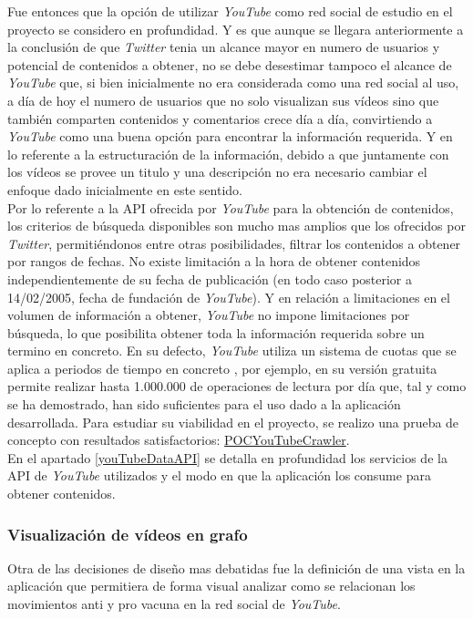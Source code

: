 \documentclass[11pt,a4paper]{article}
\begin{document}
Fue entonces que la opción de utilizar \textit{YouTube} como red social de estudio en el proyecto se considero en profundidad. Y es que aunque se llegara anteriormente a la conclusión de que \textit{Twitter} tenia un alcance mayor en numero de usuarios y potencial de contenidos a obtener, no se debe desestimar tampoco el alcance de \textit{YouTube} que, si bien inicialmente no era considerada como una red social al uso, a día de hoy el numero de usuarios que no solo visualizan sus vídeos sino que también comparten contenidos y comentarios crece día a día, convirtiendo a \textit{YouTube} como una buena opción para encontrar la información requerida. Y en lo referente a la estructuración de la información, debido a que juntamente con los vídeos se provee un titulo y una descripción no era necesario cambiar el enfoque dado inicialmente en este sentido.
\\

Por lo referente a la API ofrecida por \textit{YouTube} para la obtención de contenidos, los criterios de búsqueda disponibles son mucho mas amplios que los ofrecidos por \textit{Twitter}, permitiéndonos entre otras posibilidades, filtrar los contenidos a obtener por rangos de fechas. No existe limitación a la hora de obtener contenidos independientemente de su fecha de publicación (en todo caso posterior a 14/02/2005, fecha de fundación de \textit{YouTube}). Y en relación a limitaciones en el volumen de información a obtener, \textit{YouTube} no impone limitaciones por búsqueda, lo que posibilita obtener toda la información requerida sobre un termino en concreto. En su defecto, \textit{YouTube} utiliza un sistema de cuotas que se aplica a periodos de tiempo en concreto \cite{18}, por ejemplo, en su versión gratuita permite realizar hasta 1.000.000 de operaciones de lectura por día que, tal y como se ha demostrado, han sido suficientes para el uso dado a la aplicación desarrollada. Para estudiar su viabilidad en el proyecto, se realizo una prueba de concepto con resultados satisfactorios: \href{https://github.com/jsanchezmend/TFGAntivacunas/tree/master/POCYouTubeCrawler}{POCYouTubeCrawler}.
\\

En el apartado \ref{youTubeDataAPI} se detalla en profundidad los servicios de la API de \textit{YouTube} utilizados y el modo en que la aplicación los consume para obtener contenidos. 
\medskip 

\subsubsection{Visualización de vídeos en grafo}
Otra de las decisiones de diseño mas debatidas fue la definición de una vista en la aplicación que permitiera de forma visual analizar como se relacionan los movimientos anti y pro vacuna en la red social de \textit{YouTube}. 
\\
\end{document}
